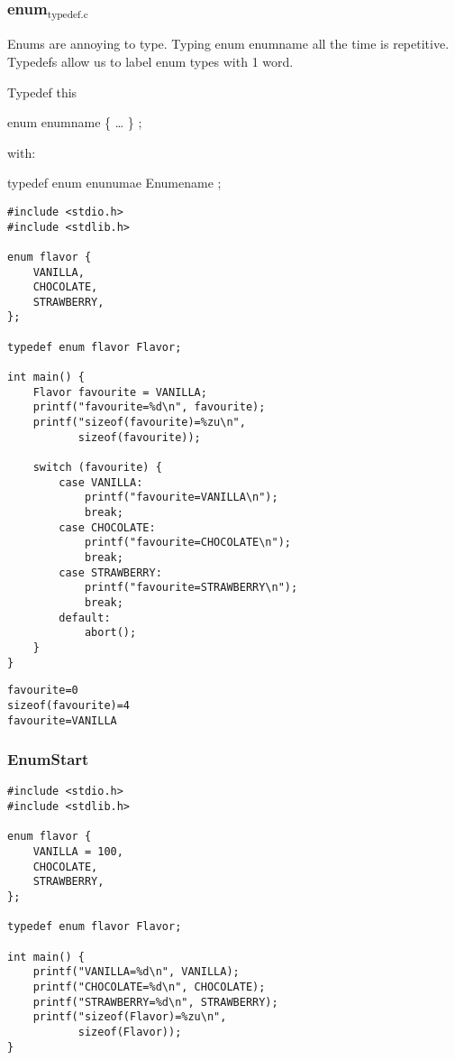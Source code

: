 \documentclass[11pt]{article}
\begin{document}
\subsubsection{enum\(_{\text{typedef.c}}\)}
\label{sec:org8825129}

Enums are annoying to type. Typing enum enumname all the time is repetitive.
Typedefs allow us to label enum types with 1 word.

Typedef this 

enum enumname \{ \ldots{} \} ;

with:

typedef enum enunumae Enumename ;


\begin{verbatim}
#include <stdio.h>
#include <stdlib.h>

enum flavor {
    VANILLA,
    CHOCOLATE,
    STRAWBERRY,
};

typedef enum flavor Flavor;

int main() {
    Flavor favourite = VANILLA;
    printf("favourite=%d\n", favourite);
    printf("sizeof(favourite)=%zu\n",
           sizeof(favourite));

    switch (favourite) {
        case VANILLA:
            printf("favourite=VANILLA\n");
            break;
        case CHOCOLATE:
            printf("favourite=CHOCOLATE\n");
            break;
        case STRAWBERRY:
            printf("favourite=STRAWBERRY\n");
            break;
        default:
            abort();
    }
}
\end{verbatim}

\begin{verbatim}
favourite=0
sizeof(favourite)=4
favourite=VANILLA
\end{verbatim}



\subsubsection{EnumStart}
\label{sec:org90c2f99}

\begin{verbatim}
#include <stdio.h>
#include <stdlib.h>

enum flavor {
    VANILLA = 100,
    CHOCOLATE,
    STRAWBERRY,
};

typedef enum flavor Flavor;

int main() {
    printf("VANILLA=%d\n", VANILLA);
    printf("CHOCOLATE=%d\n", CHOCOLATE);
    printf("STRAWBERRY=%d\n", STRAWBERRY);
    printf("sizeof(Flavor)=%zu\n",
           sizeof(Flavor));
}
\end{verbatim}
\end{document}
